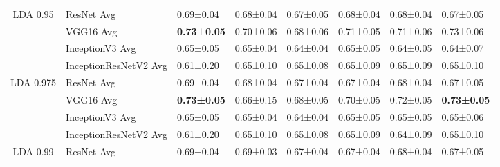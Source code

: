 \begin{landscape}
\begin{table}[]
\begin{tabular}{clllllll}
\multirow{-4}{*}{LDA 0.95}  & ResNet Avg                         & 0.69±0.04                                  & 0.68±0.04                         & 0.67±0.05                         & 0.68±0.04                         & 0.68±0.04                         & 0.67±0.05                         \\
                            & VGG16 Avg                          & \textbf{0.73±0.05}                         & 0.70±0.06                         & 0.68±0.06                         & 0.71±0.05                         & 0.71±0.06                         & 0.73±0.06                         \\
                            & InceptionV3 Avg                    & 0.65±0.05                                  & 0.65±0.04                         & 0.64±0.04                         & 0.65±0.05                         & 0.64±0.05                         & 0.64±0.07                         \\
                            & InceptionResNetV2 Avg              & 0.61±0.20                                  & 0.65±0.10                         & 0.65±0.08                         & 0.65±0.09                         & 0.65±0.09                         & 0.65±0.10                         \\
\multirow{-4}{*}{LDA 0.975} & ResNet Avg                         & 0.69±0.04                                  & 0.68±0.04                         & 0.67±0.04                         & 0.67±0.04                         & 0.68±0.04                         & 0.67±0.05                         \\
                            & VGG16 Avg                          & \textbf{0.73±0.05}                         & 0.66±0.15                         & 0.68±0.05                         & 0.70±0.05                         & 0.72±0.05                         & \textbf{0.73±0.05}                \\
                            & InceptionV3 Avg                    & 0.65±0.05                                  & 0.65±0.04                         & 0.64±0.04                         & 0.65±0.05                         & 0.65±0.05                         & 0.65±0.06                         \\
                            & InceptionResNetV2 Avg              & 0.61±0.20                                  & 0.65±0.10                         & 0.65±0.08                         & 0.65±0.09                         & 0.64±0.09                         & 0.65±0.10                         \\
\multirow{-4}{*}{LDA 0.99}  & ResNet Avg                         & 0.69±0.04                                  & 0.69±0.03                         & 0.67±0.04                         & 0.67±0.04                         & 0.68±0.04                         & 0.67±0.05                        
\end{tabular}
\label{tab:image_classification_reduction_ss}
\end{table}
\end{landscape}